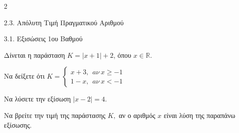 \begin{ylh}{2}
    \item 2.3. Απόλυτη Τιμή Πραγματικού Αριθμού
    \item 3.1. Εξισώσεις 1ου Βαθμού
\end{ylh}
Δίνεται η παράσταση $K = |x + 1| + 2$, όπου $x\mathbb{\in R.}$
\begin{alist}
\item Να δείξετε ότι \(K = \left\{ \begin{array}{r}
x + 3,\ \ a\nu\ x \geq - 1 \\
1 - x,\ \ a\nu\ x < - 1
\end{array} \right.\ \)
\item

\begin{rlist}
\item Να λύσετε την εξίσωση $|x - 2| = 4.$
\item Να βρείτε την τιμή της παράστασης $K,$ αν ο αριθμός $x$ είναι λύση της παραπάνω εξίσωσης.
\end{rlist}
\end{alist}

